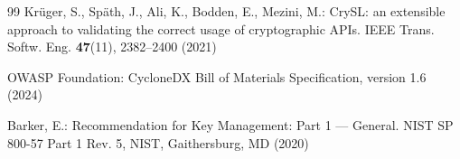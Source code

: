 \documentclass[runningheads]{llncs}
\begin{document}
\begin{thebibliography}{99}
Kr\"uger, S., Sp\"ath, J., Ali, K., Bodden, E., Mezini, M.: CrySL: an extensible
approach to validating the correct usage of cryptographic APIs. IEEE Trans.
Softw. Eng. \textbf{47}(11), 2382--2400 (2021)

OWASP Foundation: CycloneDX Bill of Materials Specification, version 1.6 (2024)

Barker, E.: Recommendation for Key Management: Part 1 --- General. NIST SP
800-57 Part 1 Rev. 5, NIST, Gaithersburg, MD (2020)

\end{thebibliography}
\end{document}
